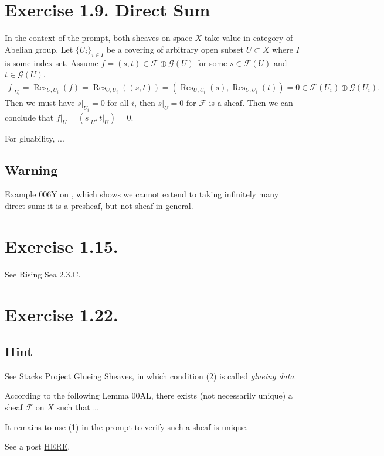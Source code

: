 \section{Exercise 1.9. Direct Sum}

In the context of the prompt, both sheaves on space $X$ take value in category of Abelian group. Let $\{U_i\}_{i\in I}$ be a covering of arbitrary open subset $U\subset X$ where $I$ is some index set. Assume $f=(s,t)\in \mathscr F\oplus\mathscr G(U)$ for some $s\in\mathscr F(U)$ and $t\in\mathscr G(U)$. 
\begin{align*}
    f\vert_{U_i}=\operatorname{Res}_{U,U_i}(f)=\operatorname{Res}_{U,U_i}((s,t))=(\operatorname{Res}_{U,U_i}(s),\operatorname{Res}_{U,U_i}(t))=0\in \mathscr F(U_i)\oplus\mathscr G(U_i).
\end{align*}
Then we must have $s\vert_{U_i}=0$ for all $i$, then $s\vert_U=0$ for $\mathscr F$ is a sheaf. Then we can conclude that $f\vert_{U}=(s\vert_U,t\vert_U)=0$.

For gluability, ...

\subsection{Warning}

Example \href{https://stacks.math.columbia.edu/tag/006Y}{006Y} on \cite{stacks-project}, which shows we cannot extend to taking infinitely many direct sum: it is a presheaf, but not sheaf in general. 

\section{Exercise 1.15.}

See Rising Sea 2.3.C.

\section{Exercise 1.22.}

\subsection{Hint}
See Stacks Project \href{https://stacks.math.columbia.edu/tag/00AK}{Glueing Sheaves}, in which condition (2) is called \textit{glueing data}. 

According to the following Lemma 00AL, there exists (not necessarily unique) a sheaf $\mathscr F$ on $X$ such that \dots

It remains to use (1) in the prompt to verify such a sheaf is unique.

See a post \href{https://math.stackexchange.com/questions/455706/gluing-sheaves-can-we-realize-mathcalfw-as-some-kind-of-limit}{HERE}.